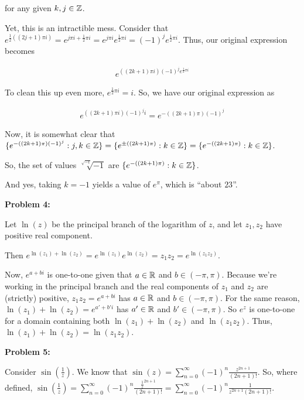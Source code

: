 \documentclass[a4paper,12pt]{article}
\begin{document}
for any given $k, j \in \mathbb{Z}$.

Yet, this is an intractible mess. Consider that $e^{\frac{1}{2}((2j+1)\pi i)} = e^{j \pi i + \frac{1}{2} \pi i} = e^{j\pi i} e^{\frac{1}{2} \pi i} = (-1)^j e^{\frac{1}{2} \pi i}$. Thus, our original expression becomes

\begin{align*}
e^{((2k+1)\pi i)(-1)^j e^{\frac{1}{2} \pi i}} 
\end{align*}

To clean this up even more, $e^{\frac{1}{2} \pi i}=i$. So, we have our original expression as 

\begin{align*}
e^{((2k+1)\pi i)(-1)^j i}  = e^{-((2k+1)\pi)(-1)^j}
\end{align*}

Now, it is somewhat clear that $\{e^{-((2k+1)\pi)(-1)^j}: j, k \in \mathbb{Z} \} = \{ e^{ \pm ((2k+1)\pi)}: k \in \mathbb{Z} \} = \{e^{-((2k+1)\pi)}: k \in \mathbb{Z} \}$.

So, the set of values $\sqrt[\sqrt{-1}]{-1}$ are $\{e^{-((2k+1)\pi)}: k \in \mathbb{Z} \}$. 

And yes, taking $k=-1$ yields a value of $e^\pi$, which is ``about $23$''.

\shunt

{\bf Problem 4:}

Let $\ln(z)$ be the principal branch of the logarithm of $z$, and let $z_1, z_2$ have positive real component.

Then $e^{\ln(z_1)+\ln(z_2)} = e^{\ln(z_1)}e^{\ln(z_2)} = z_1z_2 = e^{\ln(z_1z_2)}$.

Now, $e^{a+bi}$ is one-to-one given that $a \in \mathbb{R}$ and $b \in (-\pi,\pi)$. Because we're working in the principal branch and the real components of $z_1$ and $z_2$ are (strictly) positive, $z_1z_2 = e^{a+bi}$ has $a \in \mathbb{R}$ and $b \in (-\pi,\pi)$. For the same reason, $\ln(z_1)+\ln(z_2) = e^{a'+b'i}$ has $a' \in \mathbb{R}$ and $b' \in (-\pi, \pi)$. So $e^{z}$ is one-to-one for a domain containing both $\ln(z_1)+\ln(z_2)$ and $\ln(z_1z_2)$. Thus, $\ln(z_1)+\ln(z_2) = \ln(z_1z_2)$.

\shunt

{\bf Problem 5:}

Consider $\sin(\frac{1}{z})$. We know that $\sin(z) = \sum\limits_{n=0}^\infty (-1)^n \frac{z^{2n+1}}{(2n+1)!}$. So, where defined, $\sin(\frac{1}{z}) = \sum\limits_{n=0}^\infty (-1)^n \frac{\frac{1}{z}^{2n+1}}{(2n+1)!} = \sum\limits_{n=0}^\infty (-1)^n \frac{1}{z^{2n+1}(2n+1)!}$.
\end{document}
